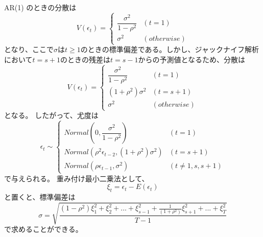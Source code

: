 \documentclass{jsarticle}
\begin{document}
AR(1) のときの分散は
\begin{equation}
V({\epsilon}_t) = 
\begin{cases}
\dfrac{\sigma ^2}{1 - \rho ^2} & (t = 1) \\
\sigma ^2 & (otherwise)
\end{cases}
\end{equation}
となり、ここで$\sigma$は$t \geq 1$のときの標準偏差である。しかし、ジャックナイフ解析において$t = s + 1$のときの残差は$t = s - 1$からの予測値となるため、分散は
\begin{equation}
V({\epsilon}_t) = 
\begin{cases}
\dfrac{\sigma ^2}{1 - \rho ^2} & (t = 1) \\
(1 + \rho ^2) \sigma ^2 & (t = s + 1) \\
\sigma ^2 & (otherwise)
\end{cases}
\end{equation}
となる。
したがって、尤度は
\begin{equation}
{\epsilon}_t \sim 
\begin{cases}
Normal \left( 0, \dfrac{\sigma ^2}{1 - \rho ^2} \right) & (t = 1) \\
Normal \left(\rho^2 \epsilon_{t-2}, (1 + \rho ^2) \sigma ^2 \right) & (t = s + 1) \\
Normal \left(\rho \epsilon_{t-1}, \sigma ^2 \right) & (t \neq 1, s, s+1)
\end{cases}
\end{equation}
で与えられる。
重み付け最小二乗法として、
$$ \xi _t = \epsilon _t - E( \epsilon_t ) $$
と置くと、標準偏差は
\begin{equation}
\sigma = \sqrt{ \frac{\left( 1 - \rho ^ 2 \right) \xi _{1} ^ 2 + \xi _{2} ^ 2 + ... + \xi _{s-1} ^ 2 + \tfrac{1}{(1 + \rho ^2)} \xi _{s+1} ^ 2 + ... + \xi _{T} ^ 2}{T - 1}} 
\end{equation}
で求めることができる。
\end{document}
